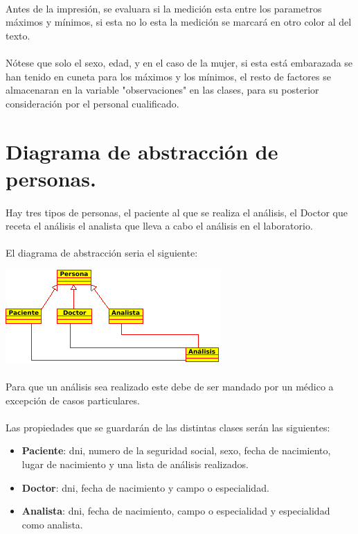 \documentclass[a4paper,10pt]{article}
\begin{document}
\paragraph{}
Antes de la impresión, se evaluara si la medición esta entre los parametros máximos y mínimos, si esta no lo esta la medición se marcará en otro color al del texto.
\paragraph{}
Nótese que solo el sexo, edad, y en el caso de la mujer, si esta está embarazada se han tenido en cuneta para los máximos y los mínimos, el resto de factores se almacenaran en la variable "observaciones" en las clases, para su posterior consideración por el personal cualificado.
\pagebreak

\section{Diagrama de abstracción de personas.}
\paragraph{}
Hay tres tipos de personas, el paciente al que se realiza el análisis, el Doctor que receta el análisis el analista que lleva a cabo el análisis en el laboratorio.
\paragraph{}
El diagrama de abstracción seria el siguiente:
\vspace{0.5cm}
\begin{center}
\includegraphics{img/personas.png}
\end{center}
\paragraph{}
Para que un análisis sea realizado este debe de ser mandado por un médico a excepción de casos particulares.
\paragraph{}
Las propiedades que se guardarán de las distintas clases serán las siguientes:
\begin{itemize}
	\item {\bf Paciente}: dni, numero de la seguridad social, sexo, fecha de nacimiento, lugar de nacimiento y una lista de análisis realizados.
	\item {\bf Doctor}: dni, fecha de nacimiento y campo o especialidad.
	\item {\bf Analista}: dni, fecha de nacimiento, campo o especialidad y especialidad como analista.
\end{itemize}
\end{document}
